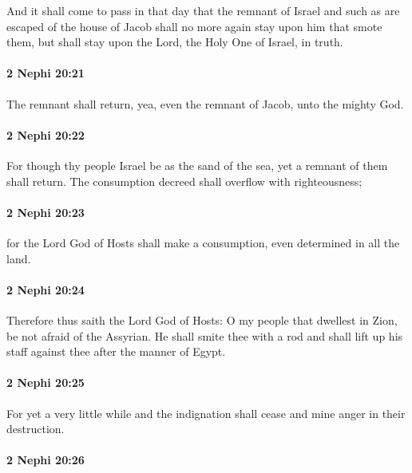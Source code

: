 			And it shall come to pass in that day
			that the remnant of Israel and such as are escaped of the house of Jacob
			shall no more again stay upon him that smote them,
			but shall stay upon the Lord, the Holy One of Israel, in truth.

		\paragraph{2 Nephi 20:21} %
			\label{2NEPHI-20-21}

			The remnant shall return,
			yea, even the remnant of Jacob, unto the mighty God.

		\paragraph{2 Nephi 20:22} %
			\label{2NEPHI-20-22}

			For though thy people Israel be as the sand of the sea,
			yet a remnant of them shall return.
			The consumption decreed shall overflow with righteousness;

		\paragraph{2 Nephi 20:23} %
			\label{2NEPHI-20-23}

			for the Lord God of Hosts shall make a consumption,
			even determined in all the land.

		\paragraph{2 Nephi 20:24} %
			\label{2NEPHI-20-24}

			Therefore thus saith the Lord God of Hosts:
			O my people that dwellest in Zion,
			be not afraid of the Assyrian.
			He shall smite thee with a rod
			and shall lift up his staff against thee after the manner of Egypt.

		\paragraph{2 Nephi 20:25} %
			\label{2NEPHI-20-25}

			For yet a very little while and the indignation shall cease
			and mine anger in their destruction.

		\paragraph{2 Nephi 20:26} %
			\label{2NEPHI-20-26}

